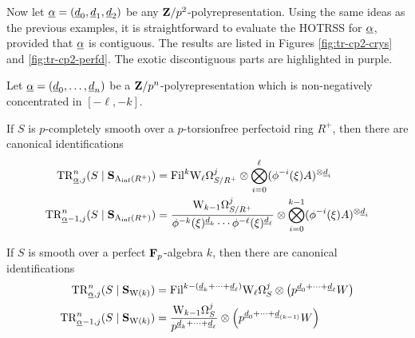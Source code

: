 \begin{example}
  Now let $\m\alpha=(\m d_0,\m d_1,\m d_2)$ be any $\Z/p^2$-polyrepresentation. Using the same ideas as the previous examples, it is straightforward to evaluate the HOTRSS for $\m\alpha$, provided that $\m\alpha$ is contiguous. The results are listed in Figures \ref{fig:tr-cp2-crys} and \ref{fig:tr-cp2-perfd}. The exotic discontiguous parts are highlighted in purple.
\end{example}


\begin{theorem}
  \label{thm:tr-ctg}
  Let $\m\alpha = (\m d_0,\dotsc, \m d_n)$ be a $\Z/p^n$-polyrepresentation which is non-negatively concentrated in $[-\ell, -k]$.

  If $S$ is $p$-completely smooth over a $p$-torsionfree perfectoid ring $R^+$, then there are canonical identifications
  \begin{align*}
    \TR^n_{\m\alpha,j}(S\mid\SAinf{R^+})
      &= \Fil^k \dRW[\ell]^j_{S/R^+} \tnsr \bigotimes_{i=0}^\ell (\phi^{-i}(\xi)A)^{\tnsr\m d_i}\\
      \TR^n_{\m\alpha-1,j}(S\mid\SAinf{R^+})
      &= \frac{\dRW[k-1]^j_{S/R^+}}{\phi^{-k}(\xi)^{\m d_k}\dotsm\phi^{-\ell}(\xi)^{\m d_\ell}}\tnsr\bigotimes_{i=0}^{k-1} (\phi^{-i}(\xi)A)^{\tnsr\m d_i}
  \end{align*}

  If $S$ is smooth over a perfect $\F_p$-algebra $k$, then there are canonical identifications
  \begin{align*}
    \TR^n_{\m\alpha,j}(S\mid\SW k)
      &= \Fil^{k-(\m d_k+\dotsb+\m d_\ell)} \dRW[\ell]^j_S\tnsr \left(p^{\m d_0 + \dotsb + \m d_\ell}W\right)\\
    \TR^n_{\m\alpha-1,j}(S\mid\SW k)
      &= \frac{\dRW[k-1]^j_S}{p^{\m d_k+\dotsb + \m d_\ell}}\otimes \left(p^{\m d_0 + \dotsb + \m d_{(k-1)}}W\right)
  \end{align*}
\end{theorem}


